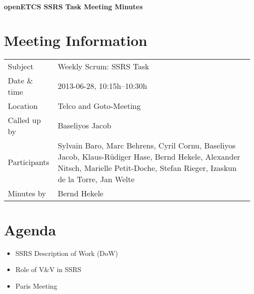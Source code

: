 \documentclass[a4paper, 11pt]{article}
\begin{document}
{\begin{center}\huge\bf openETCS SSRS Task Meeting Minutes\end{center}}
\section{Meeting Information}

\renewcommand{\arraystretch}{1.5}
\begin{supertabular}{m{.2\textwidth}m{.8\textwidth}}
Subject &  Weekly Scrum: SSRS Task\\
Date \& time & 2013-06-28, 10:15h--10:30h\\
Location & Telco and Goto-Meeting\\
Called up by & Baseliyos Jacob\\
Participants &
Sylvain Baro,
Marc Behrens,
Cyril Cornu,
Baseliyos Jacob,
Klaus-R\"udiger Hase,
Bernd Hekele,
Alexander Nitsch,
Marielle Petit-Doche,
Stefan Rieger,
Izaskun de la Torre,
Jan Welte
\\

Minutes by & Bernd Hekele\\

\end{supertabular}
\renewcommand{\arraystretch}{1.0}


\section{{Agenda}}
\begin{itemize}
\item SSRS Description of Work (DoW)\\
\item Role of V\&V in SSRS\\
\item Paris Meeting
\end{itemize}
\end{document}
